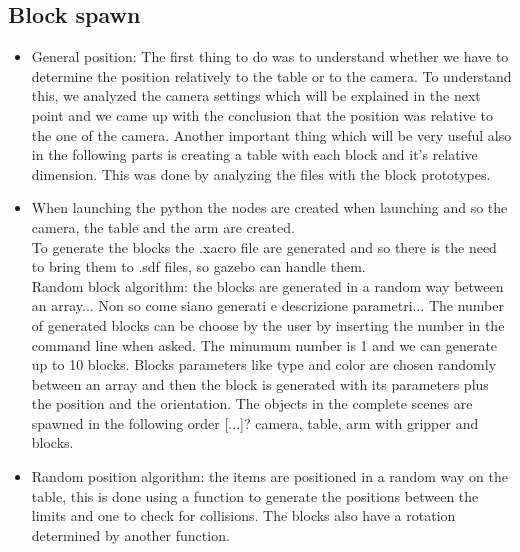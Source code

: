 \documentclass[12pt,a4paper]{article}
\begin{document}
\subsection{Block spawn}\label{subsec:blockspawn}

\begin{itemize}
    \item General position: The first thing to do was to understand whether we have to determine the position relatively to the table or to the camera. To understand this, we analyzed the camera settings which will be explained in the next point and we came up with the conclusion that the position was relative to the one of the camera.
    Another important thing which will be very useful also in the following parts is creating a table with each block and it's relative dimension. This was done by analyzing the files with the block prototypes.
    \item When launching the python the nodes are created when launching and so the camera, the table and the arm are created.\\
    To generate the blocks the .xacro file are generated and so there is the need to bring them to .sdf files, so gazebo can handle them.\\
    Random block algorithm: the blocks are generated in a random way between an array... Non so come siano generati e descrizione parametri...
    The number of generated blocks can be choose by the user by inserting the number in the command line when asked. The minumum number is 1 and we can generate up to 10 blocks. Blocks parameters like type and color are chosen randomly between an array and then the block is generated with its parameters plus the position and the orientation.
    The objects in the complete scenes are spawned in the following order [...]? camera, table, arm with gripper and blocks.
    \item Random position algorithm: the items are positioned in a random way on the table, this is done using a function to generate the positions between the limits and one to check for collisions. The blocks also have a rotation determined by another function.
\end{itemize}
\end{document}
